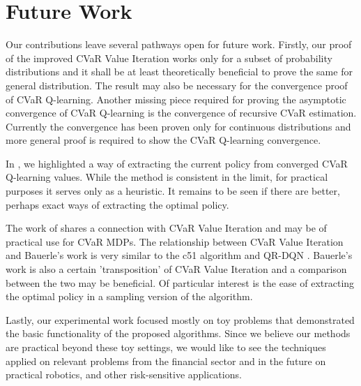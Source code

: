 
\section*{Future Work}

Our contributions leave several pathways open for future work. Firstly, our proof of the improved CVaR Value Iteration works only for a subset of probability distributions and it shall be at least theoretically beneficial to prove the same for general distribution. The result may also be necessary for the convergence proof of CVaR Q-learning. Another missing piece required for proving the asymptotic convergence of CVaR Q-learning is the convergence of recursive CVaR estimation. Currently the convergence has been proven only for continuous distributions and more general proof is required to show the CVaR Q-learning convergence.

In , we highlighted a way of extracting the current policy from converged CVaR Q-learning values. While the method is consistent in the limit, for practical purposes it serves only as a heuristic. It remains to be seen if there are better, perhaps exact ways of extracting the optimal policy.

The work of \citet{bauerle2011markov} shares a connection with CVaR Value Iteration and may be of practical use for CVaR MDPs. The relationship between CVaR Value Iteration and Bauerle's work is very similar to the c51 algorithm \citep{bellemare2017distributional} and QR-DQN \citep{dabney2017distributional}. Bauerle's work is also a certain 'transposition' of CVaR Value Iteration and a comparison between the two may be beneficial. Of particular interest is the ease of extracting the optimal policy in a sampling version of the algorithm.

Lastly, our experimental work focused mostly on toy problems that demonstrated the basic functionality of the proposed algorithms. Since we believe our methods are practical beyond these toy settings, we would like to see the techniques applied on relevant problems from the financial sector and in the future on practical robotics, and other risk-sensitive applications.


